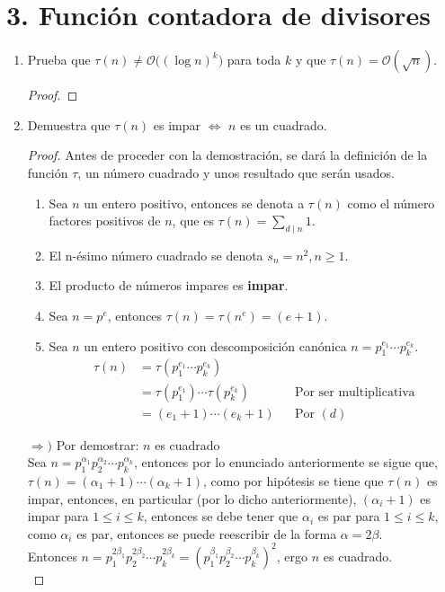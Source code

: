 \documentclass[12pt]{article}
\newcommand{\Oh}{\mathcal{O}} %
\begin{document}
\section*{3. Función contadora de divisores}
\begin{enumerate}
    \item Prueba que $\tau(n)\neq\Oh\big((\log n)^k\big)$ para toda $k$ y que $\tau(n)=\Oh(\sqrt{n})$.
    \begin{proof}
    \end{proof}
  
    \item Demuestra que $\tau(n)$ es impar $\iff$ $n$ es un cuadrado.
    \begin{proof}
    Antes de proceder con la demostración, se dará la definición de la función $\tau$, un 
    número cuadrado y unos resultado que serán usados.
    \begin{enumerate}[label=(\alph*)]
        \item Sea $n$ un entero positivo, entonces se denota a $\tau(n)$ como el número factores 
        positivos de $n$, que es $\tau(n) = \sum_{d \mid n}1$.
        \item El n-ésimo número cuadrado se denota $s_n = n^2, n \geq 1$.
        \item El producto de números impares es \textbf{impar}.
        \item Sea $n = p^e$, entonces $\tau(n) = \tau (n^e) = (e + 1)$.
        \item Sea $n$ un entero positivo con descomposición canónica $n = p_{1}^{e_1} \dotsm p_{k}^{e_k}$.
            \begin{align*}
            \tau(n)
            &= \tau(p_{1}^{e_1} \dotsm p_{k}^{e_k})\\
            &= \tau(p_{1}^{e_1}) \dotsm \tau(p_{k}^{e_k}) && \text{Por ser multiplicativa}\\
            &= (e_1 + 1) \dotsm (e_k + 1) && \text{Por $(d)$}
        \end{align*}
    \end{enumerate}
    
    $\Longrightarrow)$ Por demostrar: $n$ es cuadrado\\
    Sea $n = p_1^{\alpha_1} p_2^{\alpha_2} \dotsm p_k^{\alpha_k}$, entonces por lo enunciado 
    anteriormente se sigue que, $\tau(n) = (\alpha_1 + 1) \dotsm (\alpha_k + 1)$, como por hipótesis 
    se tiene que $\tau(n)$ es impar, entonces, en particular (por lo dicho anteriormente), $(\alpha_i +1)$ 
    es impar para $1 \leq i \leq k$, entonces se debe tener que $\alpha_i$ es par para $1 \leq i \leq k$,
    como $\alpha_i$ es par, entonces se puede reescribir de la forma $\alpha = 2 \beta$.\\
    Entonces $n = p_1^{2\beta_1} p_2^{2\beta_2} \dotsm p_k^{2\beta_k} = (p_1^{\beta_1} p_2^{\beta_2} \dotsm p_k^{\beta_k})^2$, 
    ergo $n$ es cuadrado.\\
    

\end{proof}
\end{enumerate}
\end{document}
